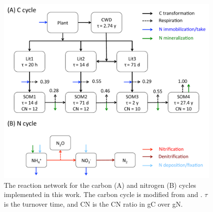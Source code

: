 \documentclass[gmd, manuscript]{copernicus}
\begin{document}









%

\clearpage
\begin{figure}[t]
\includegraphics[width=15cm]{../figs/fig01/fig01conceptualmodel.pdf}
\caption{The reaction network for the carbon (A) and nitrogen (B) cycles implemented in this work. The carbon cycle is modified from \citet{Thornton2005} and \citet{Bonan2012}. $\tau$ is the turnover time, and CN is the CN ratio in gC over gN.}
\label{fig:conceptualmodel}
\end{figure}
\end{document}
